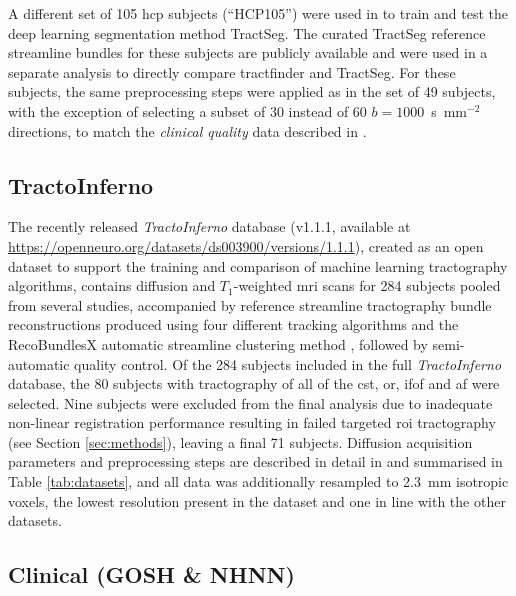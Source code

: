 A different set of 105 \gls{hcp} subjects (``HCP105'') were used in \textcite{Wasserthal2018} to train and test the deep learning segmentation method TractSeg.
The curated TractSeg reference streamline bundles for these subjects are publicly available\autocite{Wasserthal2018b} and were used in a separate analysis to directly compare tractfinder and TractSeg.
For these subjects, the same preprocessing steps were applied as in the set of 49 subjects, with the exception of selecting a subset of 30 instead of 60 $b=1000$~s~mm$^{-2}$ directions, to match the \textit{clinical quality} data described in \textcite{Wasserthal2018}.

\subsection{TractoInferno}

The recently released \textit{TractoInferno} database (v1.1.1, available at \url{https://openneuro.org/datasets/ds003900/versions/1.1.1})\autocite{Poulin2022a,Poulin2022}, created as an open dataset to support the training and comparison of machine learning tractography algorithms, contains diffusion and $T_1$-weighted \gls{mri} scans for 284 subjects pooled from several studies, accompanied by reference streamline tractography bundle reconstructions produced using four different tracking algorithms and the RecoBundlesX automatic streamline clustering method \autocite{Garyfallidis2018,Rheault2020a}, followed by semi-automatic quality control.
Of the 284 subjects included in the full \textit{TractoInferno} database, the 80 subjects with tractography of all of the \gls{cst}, \gls{or}, \gls{ifof} and \gls{af} were selected.
Nine subjects were excluded from the final analysis due to inadequate non-linear registration performance resulting in failed targeted \gls{roi} tractography (see Section \ref{sec:methods}), leaving a final 71 subjects.
Diffusion acquisition parameters and preprocessing steps are described in detail in \textcite{Poulin2022} and summarised in Table \ref{tab:datasets}, and all data was additionally resampled to 2.3~mm isotropic voxels, the lowest resolution present in the dataset and one in line with the other datasets.

\subsection{Clinical (GOSH \& NHNN)}

